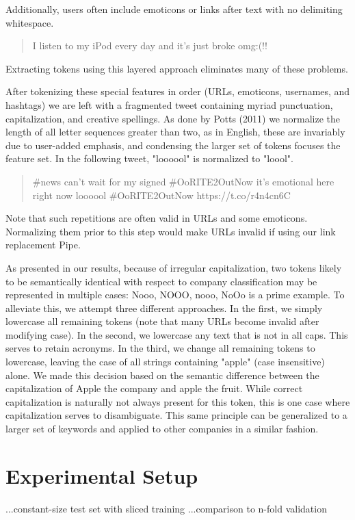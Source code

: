 \documentclass[letterpaper]{article}
\begin{document}
Additionally, users often include emoticons or links after text with no delimiting whitespace. 

\begin{quote}
I listen to my iPod every day and it's just broke omg:(!!
\end{quote}

Extracting tokens using this layered approach eliminates many of these problems.

After tokenizing these special features in order (URLs, emoticons, usernames, and hashtags) we are left with a fragmented tweet containing myriad punctuation, capitalization, and creative spellings. As done by Potts (2011) we normalize the length of all letter sequences greater than two, as in English, these are invariably due to user-added emphasis, and condensing the larger set of tokens focuses the feature set. In the following tweet, "loooool" is normalized to "loool".
\begin{quote}
\#news can't wait for my signed \#OoRITE2OutNow it's emotional here right now loooool \#OoRITE2OutNow https://t.co/r4n4cn6C 
\end{quote}

Note that such repetitions are often valid in URLs and some emoticons. Normalizing them prior to this step would make URLs invalid if using our link replacement Pipe.

As presented in our results, because of irregular capitalization, two tokens likely to be semantically identical with respect to company classification may be represented in multiple cases: {Nooo, NOOO, nooo, NoOo} is a prime example. To alleviate this, we attempt three different approaches. In the first, we simply lowercase all remaining tokens (note that many URLs become invalid after modifying case). In the second, we lowercase any text that is not in all caps. This serves to retain acronyms. In the third, we change all remaining tokens to lowercase, leaving the case of all strings containing "apple" (case insensitive) alone. We made this decision based on the semantic difference between the capitalization of Apple the company and apple the fruit. While correct capitalization is naturally not always present for this token, this is one case where capitalization serves to disambiguate. This same principle can be generalized to a larger set of keywords and applied to other companies in a similar fashion. 

\section{Experimental Setup}
...constant-size test set with sliced training
...comparison to n-fold validation
\end{document}
